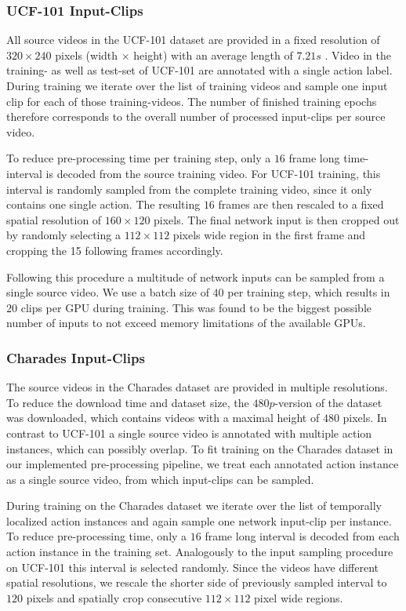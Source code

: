\subsubsection{UCF-101 Input-Clips}
All source videos in the UCF-101 dataset are provided in a fixed resolution of $320 \times 240$ pixels (width $\times$ height) with an average length of $7.21s$ \cite{soomro_ucf101:_2012}.
Video in the training- as well as test-set of UCF-101 are annotated with a single action label.
During training we iterate over the list of training videos and sample one input clip for each of those training-videos.
The number of finished training epochs therefore corresponds to the overall number of processed input-clips per source video.

To reduce pre-processing time per training step, only a $16$ frame long time-interval is decoded from the source training video.
For UCF-101 training, this interval is randomly sampled from the complete training video, since it only contains one single action.
The resulting $16$ frames are then rescaled to a fixed spatial resolution of $160 \times 120$ pixels.
The final network input is then cropped out by randomly selecting a $112 \times 112$ pixels wide region in the first frame and cropping the 15 following frames accordingly.

Following this procedure a multitude of network inputs can be sampled from a single source video.
We use a batch size of $40$ per training step, which results in $20$ clips per GPU during training.
This was found to be the biggest possible number of inputs to not exceed memory limitations of the available GPUs.

\subsubsection{Charades Input-Clips}
The source videos in the Charades dataset are provided in multiple resolutions.
To reduce the download time and dataset size, the $480p$-version of the dataset was downloaded, which contains videos with a maximal height of $480$ pixels.
In contrast to UCF-101 a single source video is annotated with multiple action instances, which can possibly overlap.
To fit training on the Charades dataset in our implemented pre-processing pipeline, we treat each annotated action instance as a single source video, from which input-clips can be sampled.

During training on the Charades dataset we iterate over the list of temporally localized action instances and again sample one network input-clip per instance.
To reduce pre-processing time, only a $16$ frame long interval is decoded from each action instance in the training set.
Analogously to the input sampling procedure on UCF-101 this interval is selected randomly.
Since the videos have different spatial resolutions, we rescale the shorter side of previously sampled interval to $120$ pixels and 
spatially crop consecutive $112 \times 112$ pixel wide regions.

